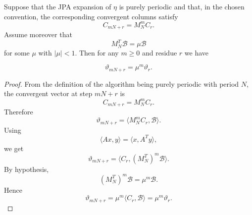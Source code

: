 \documentclass[10pt,a4paper]{amsart}
\begin{document}
\begin{theorem}\label{general}

Suppose that the JPA expansion of \(\eta\) is purely periodic and that, in the
chosen convention, the corresponding convergent columns satisfy
\[
C_{mN+r}=M_N^mC_r.
\]
Assume moreover that
\[
M_N^T\mathcal B=\mu\mathcal B
\]
for some \(\mu\) with \(|\mu|<1\). Then for any \(m\ge0\) and residue \(r\) we have

 $$\vartheta_{mN+r}=\mu^m \vartheta_{r}.$$
    
\end{theorem}

\begin{proof}
From the definition of the algorithm being purely periodic with period \(N\), the
convergent vector at step \(mN+r\) is
\[
C_{mN+r}=M_N^mC_r.
\]
Therefore
\[
\vartheta_{mN+r}
=
\langle M_N^mC_r,\mathcal B\rangle.
\]
Using
\[
\langle Ax,y\rangle=\langle x,A^Ty\rangle,
\]
we get
\[
\vartheta_{mN+r}
=
\langle C_r,(M_N^T)^m\mathcal B\rangle.
\]
By hypothesis,
\[
(M_N^T)^m\mathcal B=\mu^m\mathcal B.
\]
Hence
\[
\vartheta_{mN+r}
=
\mu^m\langle C_r,\mathcal B\rangle
=
\mu^m\vartheta_r.
\]
\end{proof}
\end{document}
